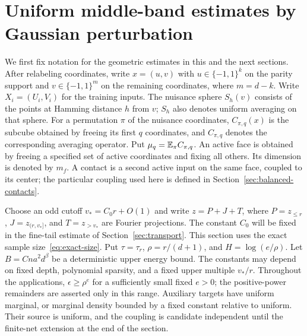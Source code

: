 \section{Uniform middle-band estimates by Gaussian perturbation}
\label{sec:middle-pac}
We first fix notation for the geometric estimates in this and the next
sections. After relabeling coordinates, write $x=(u,v)$ with
$u\in\{-1,1\}^k$ on the parity support and
$v\in\{-1,1\}^{m}$ on the remaining coordinates, where $m=d-k$.
Write $X_i=(U_i,V_i)$ for the training inputs. The nuisance sphere
$S_h(v)$ consists of the points at Hamming distance $h$ from $v$;
$S_h$ also denotes uniform averaging on that sphere. For a permutation
$\pi$ of the nuisance coordinates, $C_{\pi,q}(x)$ is the subcube
obtained by freeing its first $q$ coordinates, and $C_{\pi,q}$ denotes
the corresponding averaging operator. Put $\mu_q=\mathbb E_\pi C_{\pi,q}$.
An active face is obtained by freeing a specified set of active
coordinates and fixing all others. Its dimension is denoted by $m_f$.
A contact is a second active input on the same face, coupled to its
center; the particular coupling used here is defined in
Section~\ref{sec:balanced-contacts}.

Choose an odd cutoff $v_*=C_0r+O(1)$ and write
$z=P+J+T$, where $P=z_{\le r}$, $J=z_{(r,v_*]}$, and $T=z_{>v_*}$
are Fourier projections. The constant $C_0$ will be fixed in the
fine-tail estimate of Section~\ref{sec:transport}.
This section uses the exact sample size~\eqref{eq:exact-size}. Put
$\tau=\tau_r$, $\rho=r/(d+1)$, and $H=\log(e/\rho)$.
Let $B=Cna^2d^\beta$ be a deterministic upper energy bound. The constants
may depend on fixed depth, polynomial sparsity, and a fixed upper
multiple $v_*/r$. Throughout the applications, $\epsilon\ge\rho^e$
for a sufficiently small fixed $e>0$; the positive-power remainders are
asserted only in this range. Auxiliary targets have uniform marginal,
or marginal density bounded by a fixed constant relative to uniform.
Their source is uniform, and the coupling is candidate independent
until the finite-net extension at the end of the section.

